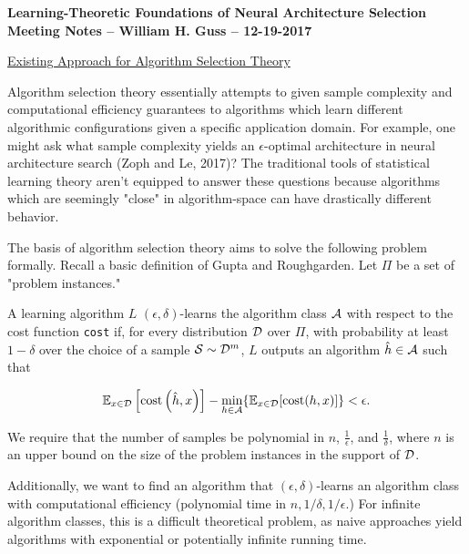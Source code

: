 \documentclass[11pt]{article}
\begin{document}
\begin{center}
	\textbf{Learning-Theoretic Foundations of Neural Architecture Selection \\ Meeting Notes -- William H. Guss -- 12-19-2017}
\end{center}

\noindent \medskip \underline{Existing Approach for Algorithm Selection Theory}

Algorithm selection theory essentially attempts to given sample complexity and computational efficiency guarantees to algorithms which learn different algorithmic configurations given a specific application domain. For example, one might ask what sample complexity yields an $\epsilon$-optimal architecture in  neural architecture search (Zoph and Le, 2017)? The traditional tools of statistical learning theory aren't equipped to answer these questions because algorithms which are seemingly "close" in algorithm-space can have drastically different behavior. 

The basis of algorithm selection theory aims to solve the following problem formally. Recall a basic definition of Gupta and Roughgarden. Let $\Pi$ be a set of "problem instances."

\begin{definition}
	A learning algorithm $L$ $(\epsilon, \delta)$-learns the algorithm class ${\mathcal A}$ with respect to the cost function \verb|cost| if, for every distribution ${\mathcal D}$ over $\Pi$, with probability at least $1 - \delta$ over the choice of a sample ${\mathcal S} \sim {\mathcal D}^m$, $L$ outputs an algorithm $\hat h \in {\mathcal A} $ such that 

	\begin{equation*}
		\mathbb{E}_{x \in {\mathcal D}}\left[  \text{cost}\left(\hat{h}, x\right)\right] - \min_{h \in {\mathcal A}} \{\mathbb{E}_{x \in {\mathcal D}}[\text{cost}(h,x)]\} < \epsilon.
	\end{equation*}

	\noindent We require that the number of samples be polynomial in $n$, $\frac{1}{\epsilon}$, and $\frac{1}{\delta}$, where $n$ is an upper bound on the size of the problem instances in the support of ${\mathcal D}$.
 \end{definition}


 Additionally, we want to find an algorithm that $(\epsilon, \delta)$-learns an algorithm class with computational efficiency (polynomial time in $n, 1/\delta, 1/\epsilon$.) For infinite algorithm classes, this is a difficult theoretical problem, as naive approaches yield algorithms with exponential or potentially infinite running time.
\end{document}

